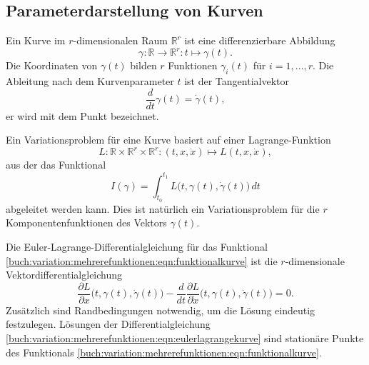 \subsection{Parameterdarstellung von Kurven
\label{buch:variation:mehrerefunktionen:subsection:kurven}}
Ein Kurve im $r$-dimensionalen Raum $\mathbb{R}^r$ ist eine differenzierbare
Abbildung
\[
\gamma
\colon
\mathbb{R} \to \mathbb{R}^r
:
t \mapsto \gamma(t).
\]
Die Koordinaten von $\gamma(t)$ bilden $r$ Funktionen $\gamma_i(t)$
für $i=1,\dots,r$.
Die Ableitung nach dem Kurvenparameter $t$ ist der Tangentialvektor
\[
\frac{d}{dt}\gamma(t) = \dot{\gamma}(t),
\]
er wird mit dem Punkt bezeichnet.

Ein Variationsproblem für eine Kurve basiert auf einer Lagrange-Funktion
\[
L
\colon
\mathbb{R}\times\mathbb{R}^r\times\mathbb{R}^r
:
(t,x,\dot{x})
\mapsto
L(t,x,\dot{x}),
\]
aus der das Funktional
\begin{equation}
I(\gamma)
=
\int_{t_0}^{t_1}
L\bigl(t,\gamma(t),\dot{\gamma}(t)\bigr)
\,dt
\label{buch:variation:mehrerefunktionen:eqn:funktionalkurve}
\end{equation}
abgeleitet werden kann.
Dies ist natürlich ein Variationsproblem für die $r$ Komponentenfunktionen
des Vektors $\gamma(t)$.

Die Euler-Lagrange-Differentialgleichung für das Funktional
\eqref{buch:variation:mehrerefunktionen:eqn:funktionalkurve}
ist die $r$-di\-men\-sio\-na\-le Vektordifferentialgleichung
\begin{equation}
\frac{\partial L}{\partial x}\bigl(t,\gamma(t), \dot{\gamma}(t)\bigr)
-
\frac{d}{dt}
\frac{\partial L}{\partial \dot{x}}\bigl(t,\gamma(t),\dot{\gamma}(t)\bigr)
=
0.
\label{buch:variation:mehrerefunktionen:eqn:eulerlagrangekurve}
\end{equation}
Zusätzlich sind Randbedingungen notwendig, um die Lösung 
eindeutig festzulegen.
Lösungen der Differentialgleichung
\eqref{buch:variation:mehrerefunktionen:eqn:eulerlagrangekurve}
sind stationäre Punkte des Funktionals
\eqref{buch:variation:mehrerefunktionen:eqn:funktionalkurve}.

%
%






